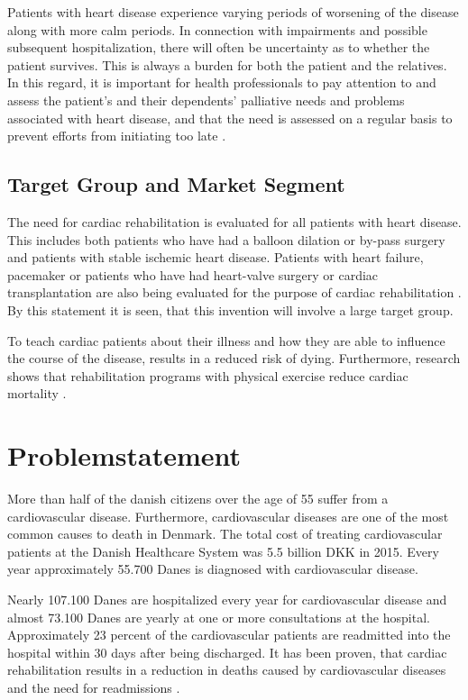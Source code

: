 Patients with heart disease experience varying periods of worsening of the disease along with more calm periods. In connection with impairments and possible subsequent hospitalization, there will often be uncertainty as to whether the patient survives. This is always a burden for both the patient and the relatives. In this regard, it is important for health professionals to pay attention to and assess the patient's and their dependents' palliative needs and problems associated with heart disease, and that the need is assessed on a regular basis to prevent efforts from initiating too late \cite{behandlingsforlob}.



\subsection{Target Group and Market Segment}

The need for cardiac rehabilitation is evaluated for all patients with heart disease. This includes both patients who have had a balloon dilation or by-pass surgery and patients with stable ischemic heart disease.
Patients with heart failure, pacemaker or patients who have had heart-valve surgery or cardiac transplantation are also being evaluated for the purpose of cardiac rehabilitation \cite{Rehabilitering}. By this statement it is seen, that this invention will involve a large target group. 

To teach cardiac patients about their illness and how they are able to influence the course of the disease, results in a reduced risk of dying. Furthermore, research shows that rehabilitation programs with physical exercise reduce cardiac mortality \cite{Hjerteforening}.    


\section{Problemstatement}
More than half of the danish citizens over the age of 55 suffer from a cardiovascular disease. Furthermore, cardiovascular diseases are one of the most common causes to death in Denmark. The total cost of treating cardiovascular patients at the Danish Healthcare System was 5.5 billion DKK in 2015. Every year approximately 55.700 Danes is diagnosed with cardiovascular disease.   

Nearly 107.100 Danes are hospitalized every year for cardiovascular disease and almost 73.100 Danes are yearly at one or more consultations at the hospital. Approximately 23 percent of the cardiovascular patients are readmitted into the hospital within 30 days after being discharged. It has been proven, that cardiac rehabilitation results in a reduction in deaths caused by cardiovascular diseases and the need for readmissions \cite{Hjerteforening}.

